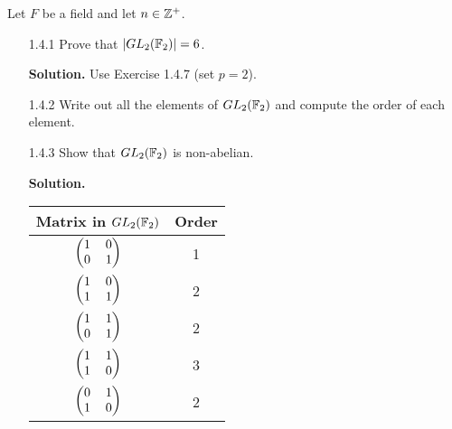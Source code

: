 Let $F$ be a field and let $n \in \mathbb{Z}^+$.
\begin{enumerate}
   \item[1.4.1]   Prove that $|GL_2(\mathbb{F}_2)| = 6$.

      \textbf{Solution.} Use Exercise 1.4.7 (set $p = 2$).
   \item[1.4.2]   Write out all the elements of $GL_2(\mathbb{F}_2)$ and compute the
                  order of each element.
   \item[1.4.3]   Show that $GL_2(\mathbb{F}_2)$ is non-abelian.

      \textbf{Solution.}
      \begin{center}
         \begin{tabular}{@{}|c|c|@{}} \hline
            Matrix in $GL_2(\mathbb{F}_2)$           & Order  \\ \hline            
            $\left(\begin{tabular}{@{}cc@{}}
               1 & 0 \\
               0 & 1
            \end{tabular}\right)$            & 1      \\ \hline           
            $\left(\begin{tabular}{@{}cc@{}}
               1 & 0 \\
               1 & 1
            \end{tabular}\right)$            & 2      \\ \hline           
            $\left(\begin{tabular}{@{}cc@{}}
               1 & 1 \\
               0 & 1
            \end{tabular}\right)$            & 2      \\ \hline           
            $\left(\begin{tabular}{@{}cc@{}}
               1 & 1 \\
               1 & 0
            \end{tabular}\right)$            & 3      \\ \hline           
            $\left(\begin{tabular}{@{}cc@{}}
               0 & 1 \\
               1 & 0
            \end{tabular}\right)$            & 2      \\ \hline           

\end{tabular}
\end{center}
\end{enumerate}
